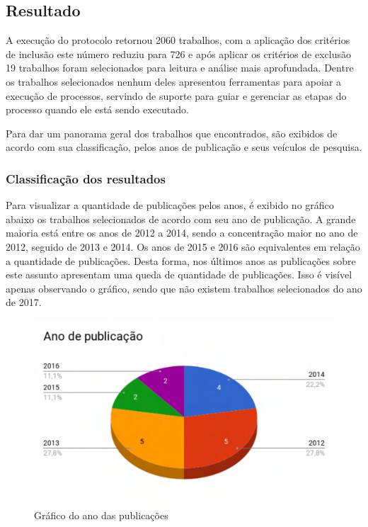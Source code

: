 \subsection{Resultado}\label{sub:trabalhosRelacionados_resultados}
A execução do protocolo retornou 2060 trabalhos, com a aplicação dos critérios de inclusão este número reduziu para 726 e após aplicar os critérios de exclusão 19 trabalhos foram selecionados para leitura e análise mais aprofundada. Dentre os trabalhos selecionados nenhum deles apresentou ferramentas para apoiar a execução de processos, servindo de suporte para guiar e gerenciar as etapas do processo quando ele está sendo executado.

Para dar um panorama geral dos trabalhos que encontrados, são exibidos de acordo com sua classificação, pelos anos de publicação e seus veículos de pesquisa.

\subsubsection{Classificação dos resultados}
Para visualizar a quantidade de publicações pelos anos, é exibido no gráfico abaixo os trabalhos selecionados de acordo com seu ano de publicação. A grande maioria está entre os anos de 2012 a 2014, sendo a concentração maior no ano de 2012, seguido de 2013 e 2014. Os anos de 2015 e 2016 são equivalentes em relação a quantidade de publicações. Desta forma, nos últimos anos as publicações sobre este assunto apresentam uma queda de quantidade de publicações. Isso é visível apenas observando o gráfico, sendo que não existem trabalhos selecionados do ano de 2017.
\begin{figure}[!htb]
	\caption{Gráfico do ano das publicações}\label{fig:ano}
	\begin{center}
		\includegraphics[scale=0.6]{img/GrafAno}
	\end{center}
\end{figure}

